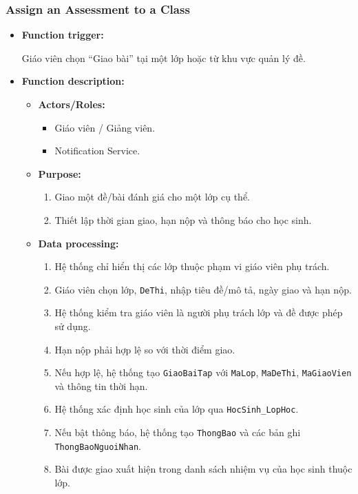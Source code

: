 \documentclass[12pt,a4paper,oneside]{report}
\begin{document}
\subsubsection{Assign an Assessment to a Class}
\label{subsubsec:assign-assessment-class}

\begin{itemize}

    \item \textbf{Function trigger:}

    Giáo viên chọn ``Giao bài'' tại một lớp hoặc từ khu vực quản lý đề.

    \item \textbf{Function description:}

    \begin{itemize}

        \item \textbf{Actors/Roles:}
        \begin{itemize}
            \item Giáo viên / Giảng viên.
            \item Notification Service.
        \end{itemize}

        \item \textbf{Purpose:}
        \begin{enumerate}
            \item Giao một đề/bài đánh giá cho một lớp cụ thể.
            \item Thiết lập thời gian giao, hạn nộp và thông báo cho học sinh.
        \end{enumerate}

        \item \textbf{Data processing:}
        \begin{enumerate}
            \item Hệ thống chỉ hiển thị các lớp thuộc phạm vi giáo viên phụ trách.
            \item Giáo viên chọn lớp, \texttt{DeThi}, nhập tiêu đề/mô tả, ngày giao và hạn nộp.
            \item Hệ thống kiểm tra giáo viên là người phụ trách lớp và đề được phép sử dụng.
            \item Hạn nộp phải hợp lệ so với thời điểm giao.
            \item Nếu hợp lệ, hệ thống tạo \texttt{GiaoBaiTap} với \texttt{MaLop}, \texttt{MaDeThi}, \texttt{MaGiaoVien} và thông tin thời hạn.
            \item Hệ thống xác định học sinh của lớp qua \texttt{HocSinh\_LopHoc}.
            \item Nếu bật thông báo, hệ thống tạo \texttt{ThongBao} và các bản ghi \texttt{ThongBaoNguoiNhan}.
            \item Bài được giao xuất hiện trong danh sách nhiệm vụ của học sinh thuộc lớp.
        \end{enumerate}


\end{itemize}
\end{itemize}
\end{document}
